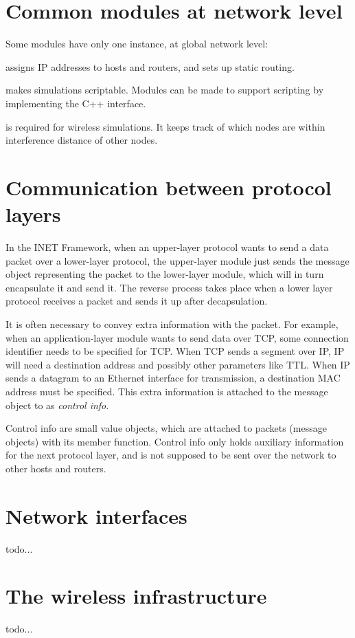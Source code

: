\section{Common modules at network level}

Some modules have only one instance, at global network level:

 assigns IP addresses to hosts and routers,
and sets up static routing.

 makes simulations scriptable. Modules can be made to support
scripting by implementing the  C++ interface.

 is required for wireless simulations. It keeps track of which
nodes are within interference distance of other nodes.


\section{Communication between protocol layers}

In the INET Framework, when an upper-layer protocol wants to send a data
packet over a lower-layer protocol, the upper-layer module just sends the
message object representing the packet to the lower-layer module, which
will in turn encapsulate it and send it. The reverse process takes place
when a lower layer protocol receives a packet and sends it up after
decapsulation.

It is often necessary to convey extra information with the packet. For
example, when an application-layer module wants to send data over TCP, some
connection identifier needs to be specified for TCP. When TCP sends a
segment over IP, IP will need a destination address and possibly other
parameters like TTL. When IP sends a datagram to an Ethernet interface for
transmission, a destination MAC address must be specified. This extra
information is attached to the message object to as \textit{control info}.

Control info are small value objects, which are attached to packets
(message objects) with its  member function.
Control info only holds auxiliary information for the next protocol layer,
and is not supposed to be sent over the network to other hosts and routers.

\section{Network interfaces}

todo...

\section{The wireless infrastructure}

todo...



